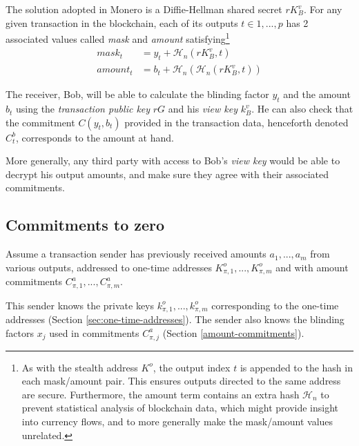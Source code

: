 The solution adopted in Monero is a Diffie-Hellman shared secret $r K_B^v$. For any given transaction in the blockchain, each of its outputs $t \in {1, ..., p}$ has 2 associated values called {\em mask} and {\em amount}  satisfying\footnote{As with the stealth address $K^o$, the output index $t$ is appended to the hash in each mask/amount pair. This ensures outputs directed to the same address are secure.
Furthermore, the amount term contains an extra hash $\mathcal{H}_n$ to prevent statistical analysis of blockchain data, which might provide insight into currency flows, and to more generally make the mask/amount values unrelated.}%
\begin{align*}
  \mathit{mask}_t     &= y_t + \mathcal{H}_n(r K_B^v, t) \\
  \mathit{amount}_t   &= b_t + \mathcal{H}_n(\mathcal{H}_n(r K_B^v, t))
\end{align*}

The receiver, Bob, will be able to calculate the blinding factor $y_t$ and the amount $b_t$ using the {\em transaction public key} $r G$ and his {\em view key} $k_B^v$. He can also check that the commitment $C(y_t, b_t)$ provided in the transaction data, henceforth denoted $C_t^b$,  corresponds to the amount at hand.

More generally, any third party with access to Bob’s {\em view key} would be able to decrypt his output amounts, and make sure they agree with their associated commitments.



\subsection{Commitments to zero}
\label{sec:commitments-to-zero}

Assume a transaction sender has previously received amounts $a_1, ..., a_m$ from various outputs, addressed to one-time addresses $K_{\pi,1}^o, ..., K_{\pi,m}^o$ and with amount commitments $C_{\pi,1}^a, ..., C_{\pi,m}^a$.

This sender knows the private keys $k_{\pi,1}^o, ..., k_{\pi,m}^o$ corresponding to the one-time addresses (Section \ref{sec:one-time-addresses}). The sender also knows the blinding factors $x_j$ used in commitments $C_{\pi,j}^a$ (Section \ref{amount-commitments}).

